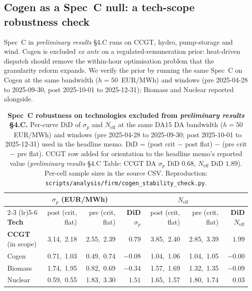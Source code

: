 \documentclass[11pt,a4paper]{article}
\begin{document}
\subsection*{Cogen as a Spec~C null: a tech-scope robustness check}\label{sec:prov:cogen_stability}

\noindent Spec~C in \emph{preliminary results} \S 4.C runs on CCGT, hydro, pump-storage and wind. Cogen is excluded \emph{ex ante} on a regulated-remuneration prior: heat-driven dispatch should remove the within-hour optimisation problem that the granularity reform expands. We verify the prior by running the same Spec~C on Cogen at the same bandwidth ($h = 50$~EUR/MWh) and windows (pre 2025-04-28 to 2025-09-30, post 2025-10-01 to 2025-12-31); Biomass and Nuclear reported alongside.

\begin{table}[H]
\centering\footnotesize
\caption{\textbf{Spec~C robustness on technologies excluded from
\emph{preliminary results} \S 4.C.} Per-curve DiD of $\sigma_p$ and
$N_{\text{eff}}$ at the same DA15 DA bandwidth ($h = 50$~EUR/MWh)
and windows (pre 2025-04-28 to 2025-09-30; post 2025-10-01 to
2025-12-31) used in the headline memo. DiD = (post crit $-$ post
flat) $-$ (pre crit $-$ pre flat). CCGT row added for orientation
to the headline memo's reported value (\emph{preliminary results}
\S 4.C Table: CCGT DA $\sigma_p$ DiD $0.68$, $N_{\text{eff}}$ DiD
$1.89$). Per-cell sample sizes in the source CSV.
Reproduction: \texttt{scripts/analysis/firm/cogen\_stability\_check.py}.}
\label{tab:cogen_specc}
\setlength{\tabcolsep}{4pt}
\begin{tabular}{l r r r r r r}
\toprule
        & \multicolumn{2}{c}{$\sigma_p$ (EUR/MWh)} & & \multicolumn{2}{c}{$N_{\text{eff}}$} & \\
\cmidrule(lr){2-3} \cmidrule(lr){5-6}
\textbf{Tech} & post (crit, flat) & pre (crit, flat) & \textbf{DiD $\sigma_p$} & post (crit, flat) & pre (crit, flat) & \textbf{DiD $N_{\text{eff}}$} \\
\midrule
\textbf{CCGT} (in scope)   & 3.14,\ 2.18 & 2.55,\ 2.39 & \textbf{$0.79$} & 3.85,\ 2.40 & 2.85,\ 3.39 & \textbf{$1.99$} \\
\midrule
Cogen     & 0.71,\ 1.03 & 0.49,\ 0.74 & $-0.08$ & 1.04,\ 1.06 & 1.04,\ 1.05 & $-0.00$ \\
Biomass   & 1.74,\ 1.95 & 0.82,\ 0.69 & $-0.34$ & 1.57,\ 1.69 & 1.32,\ 1.35 & $-0.09$ \\
Nuclear   & 0.59,\ 0.55 & 1.83,\ 3.30 & $1.51$ & 1.65,\ 1.57 & 1.80,\ 1.74 & $0.03$ \\
\bottomrule
\end{tabular}
\end{table}
\end{document}
